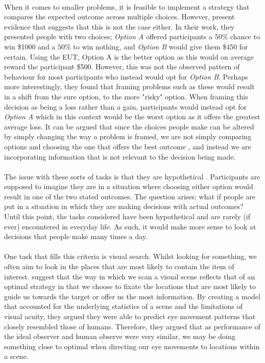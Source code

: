 \documentclass[12pt]{article}
\begin{document}
\paragraph{} When it comes to smaller problems, it is feasible to implement a strategy that compares the expected outcome across multiple choices. However, \cite{KahnemanProspect} present evidence that suggests that this is not the case either. In their work, they presented people with two choices; \textit{Option A} offered participants a $50\%$ chance to win \$1000 and a $50\%$ to win nothing, and \textit{Option B} would give them \$450 for certain. Using the EUT, Option A is the better option as this would on average reward the participant \$500. However, this was not the observed pattern of behaviour for most participants who instead would opt for \textit{Option B}. Perhaps more interestingly, they found that framing problems such as these would result in a shift from the sure option, to the more "risky" option. When framing this decision as being a loss rather than a gain, participants would instead opt for \textit{Option A} which in this context would be the worst option as it offers the greatest average loss. It can be argued that since the choices people make can be altered by simply changing the way a problem is framed, we are not simply comparing options and choosing the one that offers the best outcome \citep{KahnemanChoicesValuseFrames}, and instead we are incorporating information that is not relevant to the decision being made.

\paragraph{} The issue with these sorts of tasks is that they are hypothetical \citep{KahnemanProspect}. Participants are supposed to imagine they are in a situation where choosing either option would result in one of the two stated outcomes. The question arises; what if people are put in a situation in which they are making decisions with actual outcomes? Until this point, the tasks considered have been hypothetical and are rarely (if ever) encountered in everyday life. As such, it would make more sense to look at decisions that people make many times a day. 

\paragraph{} One task that fills this criteria is visual search. Whilst looking for something, we often aim to look in the places that are most likely to contain the item of interest. \cite{najemnik2005optimal} suggest that the way in which we scan a visual scene reflects that of an optimal strategy in that we choose to fixate the locations that are most likely to guide us towards the target or offer us the most information. By creating a model that accounted for the underlying statistics of a scene and the limitations of visual acuity, they argued they were able to predict eye movement patterns that closely resembled those of humans. Therefore, they argued that as performance of the ideal observer and human observe were very similar, we may be doing something close to optimal when directing our eye movements to locations within a scene.
\end{document}
